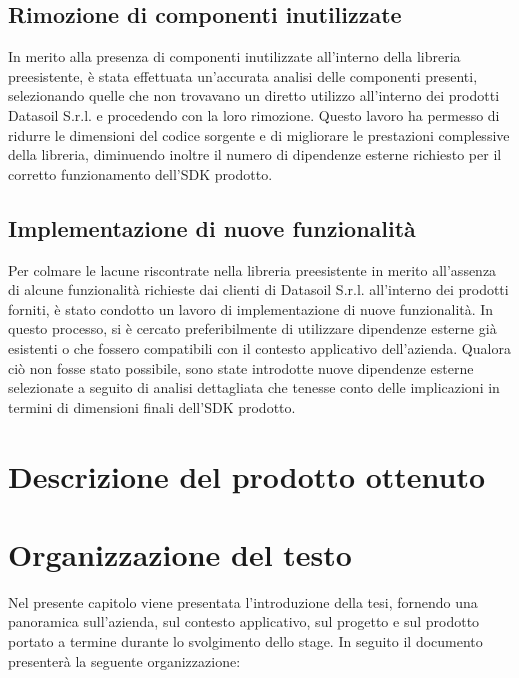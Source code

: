 \subsection{Rimozione di componenti inutilizzate}
In merito alla presenza di componenti inutilizzate all'interno della libreria preesistente, è stata effettuata un'accurata analisi delle componenti presenti, selezionando
quelle che non trovavano un diretto utilizzo all'interno dei prodotti Datasoil S.r.l. e procedendo con la loro rimozione. \newline
Questo lavoro ha permesso di ridurre le dimensioni del codice sorgente e di migliorare le prestazioni complessive della libreria, diminuendo inoltre il numero di dipendenze
esterne richiesto per il corretto funzionamento dell'SDK prodotto.

\subsection{Implementazione di nuove funzionalità}
Per colmare le lacune riscontrate nella libreria preesistente in merito all'assenza di alcune funzionalità richieste dai clienti di Datasoil S.r.l. all'interno dei prodotti forniti,
è stato condotto un lavoro di implementazione di nuove funzionalità. \newline
In questo processo, si è cercato preferibilmente di utilizzare dipendenze esterne già esistenti o che fossero compatibili con il contesto applicativo dell'azienda. Qualora ciò non
fosse stato possibile, sono state introdotte nuove dipendenze esterne selezionate a seguito di analisi dettagliata che tenesse conto delle implicazioni in termini di dimensioni
finali dell'SDK prodotto.


\section{Descrizione del prodotto ottenuto}

\section{Organizzazione del testo}
Nel presente capitolo viene presentata l'introduzione della tesi, fornendo una panoramica sull'azienda, sul contesto applicativo,
sul progetto e sul prodotto portato a termine durante lo svolgimento dello stage. \newline
In seguito il documento presenterà la seguente organizzazione:

